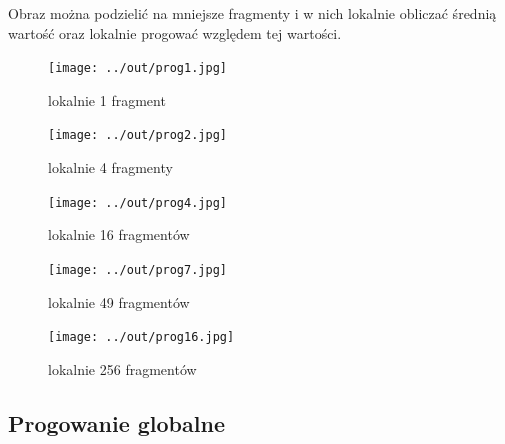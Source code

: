 \documentclass[a4paper,12pt]{article}
\begin{document}
Obraz można podzielić na mniejsze fragmenty i w nich lokalnie obliczać średnią wartość oraz lokalnie progować względem tej wartości.

\newpage
\begin{figure}[h!]
\begin{minipage}[t]{6.5cm}
\begin{center}
\texttt{[image: ../out/prog1.jpg]}
\caption{lokalnie 1 fragment}
\end{center}
\end{minipage}
\hfill
\begin{minipage}[t]{6.5cm}
\begin{center}
\texttt{[image: ../out/prog2.jpg]}
\caption{lokalnie 4 fragmenty}
\end{center}
\end{minipage}
\end{figure}

\begin{figure}[h!]
\begin{minipage}[t]{6.5cm}
\begin{center}
\texttt{[image: ../out/prog4.jpg]}
\caption{lokalnie 16 fragmentów}
\end{center}
\end{minipage}
\hfill
\begin{minipage}[t]{6.5cm}
\begin{center}
\texttt{[image: ../out/prog7.jpg]}
\caption{lokalnie 49 fragmentów}
\end{center}
\end{minipage}
\end{figure}

\begin{figure}[h!]
\begin{minipage}[t]{6.5cm}
\begin{center}
\texttt{[image: ../out/prog16.jpg]}
\caption{lokalnie 256 fragmentów}
\end{center}
\end{minipage}
\end{figure}





\newpage
\subsection{Progowanie globalne}
\end{document}
